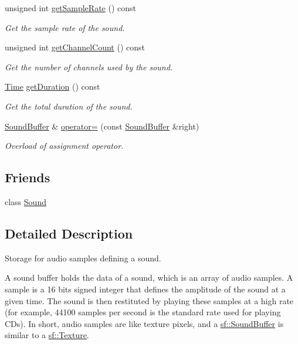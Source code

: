 \begin{DoxyCompactItemize}
unsigned int \hyperlink{classsf_1_1_sound_buffer_a8cdfaea2ad1d05f81fa67442566c166e}{get\-Sample\-Rate} () const 
\begin{DoxyCompactList}\small\item\em Get the sample rate of the sound. \end{DoxyCompactList}\item 
unsigned int \hyperlink{classsf_1_1_sound_buffer_a0a2890747db3811fb8d969d3e3abd0d1}{get\-Channel\-Count} () const 
\begin{DoxyCompactList}\small\item\em Get the number of channels used by the sound. \end{DoxyCompactList}\item 
\hyperlink{classsf_1_1_time}{Time} \hyperlink{classsf_1_1_sound_buffer_aee681c7a0f3dff4c4d0c9f8bbdb51bb0}{get\-Duration} () const 
\begin{DoxyCompactList}\small\item\em Get the total duration of the sound. \end{DoxyCompactList}\item 
\hyperlink{classsf_1_1_sound_buffer}{Sound\-Buffer} \& \hyperlink{classsf_1_1_sound_buffer_adcc786b60bbd95be1551368fafd274a7}{operator=} (const \hyperlink{classsf_1_1_sound_buffer}{Sound\-Buffer} \&right)
\begin{DoxyCompactList}\small\item\em Overload of assignment operator. \end{DoxyCompactList}\end{DoxyCompactItemize}
\subsection*{Friends}
\begin{DoxyCompactItemize}
\item 
class \hyperlink{classsf_1_1_sound_buffer_a50914f77c7cf4fb97616c898c5291f4b}{Sound}
\end{DoxyCompactItemize}


\subsection{Detailed Description}
Storage for audio samples defining a sound. 

A sound buffer holds the data of a sound, which is an array of audio samples. A sample is a 16 bits signed integer that defines the amplitude of the sound at a given time. The sound is then restituted by playing these samples at a high rate (for example, 44100 samples per second is the standard rate used for playing C\-Ds). In short, audio samples are like texture pixels, and a \hyperlink{classsf_1_1_sound_buffer}{sf\-::\-Sound\-Buffer} is similar to a \hyperlink{classsf_1_1_texture}{sf\-::\-Texture}.

